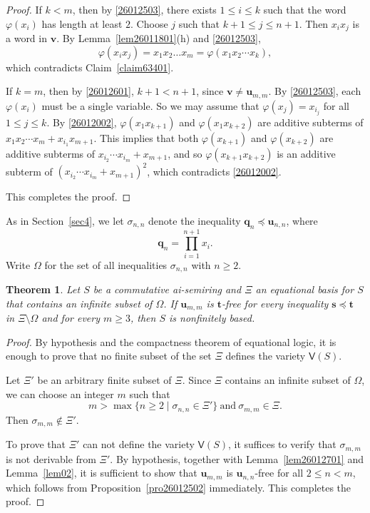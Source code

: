 \documentclass[reqno]{amsart}
\theoremstyle{plain}
\newtheorem{thm}{Theorem}[section]
\theoremstyle{definition}
\newcommand{\bq}{\mathbf{q}}
\newcommand{\bs}{\mathbf{s}}
\newcommand{\bt}{\mathbf{t}}
\newcommand{\bu}{\mathbf{u}}
\newcommand{\bv}{\mathbf{v}}
\begin{document}
\begin{proof}
If $k<m$, then by \eqref{26012503}, there exists $1\leq i\leq k$ such that the word $\varphi(x_i)$ has length at least $2$.
Choose $j$ such that $k+1\leq j\leq n+1$.
Then $x_ix_j$ is a word in $\bv$.
By Lemma~\ref{lem26011801}(h) and \eqref{26012503},
\[
\varphi(x_ix_j)=x_1x_2\dots x_m=\varphi(x_1x_2\cdots x_k),
\]
which contradicts Claim~\ref{claim63401}.

If $k=m$, then by \eqref{26012601}, $k+1<n+1$, since $\bv\neq\bu_{m, m}$.
By \eqref{26012503}, each $\varphi(x_i)$ must be a single variable.
So we may assume that $\varphi(x_j)=x_{i_j}$ for all $1\leq j \leq k$.
By \eqref{26012002},
$\varphi(x_1x_{k+1})$ and $\varphi(x_1x_{k+2})$ are additive subterms of $x_1x_2\cdots x_m+x_{i_1}x_{m+1}$.
This implies that both $\varphi(x_{k+1})$ and $\varphi(x_{k+2})$ are additive subterms of $x_{i_2}\cdots x_{i_m}+x_{m+1}$,
and so $\varphi(x_{k+1}x_{k+2})$ is an additive subterm of $(x_{i_2}\cdots x_{i_m}+x_{m+1})^2$,
which contradicts \eqref{26012002}.

This completes the proof.
\end{proof}

As in Section~\ref{sec4}, we let $\sigma_{n, n}$ denote the inequality $\bq_n \preceq \bu_{n, n}$,
where
\[
\bq_n=\prod_{i=1}^{n+1}x_i.
\]
Write $\Omega$ for the set of all inequalities $\sigma_{n, n}$ with $n\geq 2$.

\begin{thm}\label{thm26012501}
Let $S$ be a commutative ai-semiring
and $\Xi$ an equational basis for $S$ that contains an infinite subset of $\Omega$.
If $\bu_{m, m}$ is $\bt$-free for every inequality $\bs\preceq\bt$ in $\Xi\setminus \Omega$
and for every $m\geq 3$, then $S$ is nonfinitely based.
\end{thm}
\begin{proof}
By hypothesis and the compactness theorem of equational logic,
it is enough to prove that no finite subset of the set $\Xi$ defines the variety $\mathsf{V}(S)$.

Let $\Xi'$ be an arbitrary finite subset of $\Xi$.
Since $\Xi$ contains an infinite subset of $\Omega$, we can choose an integer $m$ such that
\[
m>\max\{n\geq 2\mid  \sigma_{n, n} \in \Xi'\} ~\text{and}~\sigma_{m, m}\in\Xi.
\]
Then $\sigma_{m, m}\notin\Xi'$.

To prove that $\Xi'$ can not define the variety $\mathsf{V}(S)$,
it suffices to verify that $\sigma_{m, m}$ is not derivable from $\Xi'$.
By hypothesis, together with Lemma~\ref{lem26012701} and Lemma~\ref{lem02},
it is sufficient to show that $\bu_{m, m}$ is $\bu_{n, n}$-free for all $2 \leq n<m$,
which follows from Proposition~\ref{pro26012502} immediately.
This completes the proof.
\end{proof}
\end{document}
